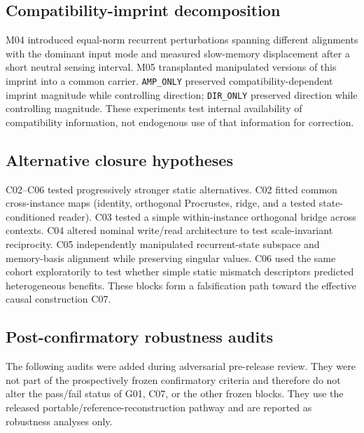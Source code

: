 \documentclass[11pt]{article}
\begin{document}
\subsection{Compatibility-imprint decomposition}

M04 introduced equal-norm recurrent perturbations spanning different alignments with the dominant input mode and measured slow-memory displacement after a short neutral sensing interval. M05 transplanted manipulated versions of this imprint into a common carrier. \texttt{AMP\_ONLY} preserved compatibility-dependent imprint magnitude while controlling direction; \texttt{DIR\_ONLY} preserved direction while controlling magnitude. These experiments test internal availability of compatibility information, not endogenous use of that information for correction.

\subsection{Alternative closure hypotheses}

C02--C06 tested progressively stronger static alternatives. C02 fitted common cross-instance maps (identity, orthogonal Procrustes, ridge, and a tested state-conditioned reader). C03 tested a simple within-instance orthogonal bridge across contexts. C04 altered nominal write/read architecture to test scale-invariant reciprocity. C05 independently manipulated recurrent-state subspace and memory-basis alignment while preserving singular values. C06 used the same cohort exploratorily to test whether simple static mismatch descriptors predicted heterogeneous benefits. These blocks form a falsification path toward the effective causal construction C07.


\subsection{Post-confirmatory robustness audits}

The following audits were added during adversarial pre-release review. They were not part of the prospectively frozen confirmatory criteria and therefore do not alter the pass/fail status of G01, C07, or the other frozen blocks. They use the released portable/reference-reconstruction pathway and are reported as robustness analyses only.
\end{document}
